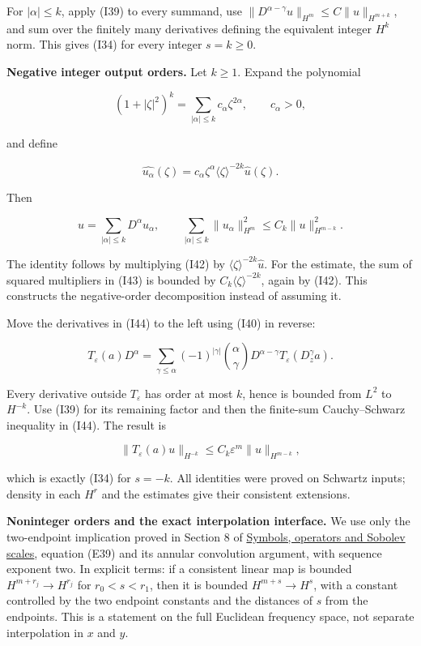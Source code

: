 \documentclass[
  11pt,
]{article}
\begin{document}
For \(|\alpha|\leq k\), apply (I39) to every summand, use
\(\|D^{\alpha-\gamma}u\|_{H^m}\leq C\|u\|_{H^{m+k}}\), and sum over the
finitely many derivatives defining the equivalent integer \(H^k\) norm.
This gives (I34) for every integer \(s=k\geq0\).

\textbf{Negative integer output orders.} Let \(k\geq1\). Expand the
polynomial

\[
 (1+|\zeta|^2)^k
      =\sum_{|\alpha|\leq k}c_\alpha\zeta^{2\alpha},
      \qquad c_\alpha>0,
 \tag{I42}
\]

and define

\[
 \widehat{u_\alpha}(\zeta)
        =c_\alpha\zeta^\alpha\langle\zeta\rangle^{-2k}
                        \widehat u(\zeta).
 \tag{I43}
\]

Then

\[
 u=\sum_{|\alpha|\leq k}D^\alpha u_\alpha,
 \qquad
 \sum_{|\alpha|\leq k}\|u_\alpha\|_{H^m}^2
       \leq C_k\|u\|_{H^{m-k}}^2.
 \tag{I44}
\]

The identity follows by multiplying (I42) by
\(\langle\zeta\rangle^{-2k}\widehat u\). For the estimate, the sum of
squared multipliers in (I43) is bounded by
\(C_k\langle\zeta\rangle^{-2k}\), again by (I42). This constructs the
negative-order decomposition instead of assuming it.

Move the derivatives in (I44) to the left using (I40) in reverse:

\[
 T_\varepsilon(a)D^\alpha
   =\sum_{\gamma\leq\alpha}(-1)^{|\gamma|}
       {\alpha\choose\gamma}
       D^{\alpha-\gamma}T_\varepsilon(D_z^\gamma a).
 \tag{I45}
\]

Every derivative outside \(T_\varepsilon\) has order at most \(k\),
hence is bounded from \(L^2\) to \(H^{-k}\). Use (I39) for its remaining
factor and then the finite-sum Cauchy--Schwarz inequality in (I44). The
result is

\[
 \|T_\varepsilon(a)u\|_{H^{-k}}
       \leq C_k\varepsilon^m\|u\|_{H^{m-k}},
 \tag{I46}
\]

which is exactly (I34) for \(s=-k\). All identities were proved on
Schwartz inputs; density in each \(H^r\) and the estimates give their
consistent extensions.

\textbf{Noninteger orders and the exact interpolation interface.} We use
only the two-endpoint implication proved in Section 8 of
\href{euclidean-symbol-calculus.pdf}{Symbols, operators and Sobolev
scales}, equation (E39) and its annular convolution argument, with
sequence exponent two. In explicit terms: if a consistent linear map is
bounded \(H^{m+r_j}\to H^{r_j}\) for \(r_0<s<r_1\), then it is bounded
\(H^{m+s}\to H^s\), with a constant controlled by the two endpoint
constants and the distances of \(s\) from the endpoints. This is a
statement on the full Euclidean frequency space, not separate
interpolation in \(x\) and \(y\).
\end{document}
